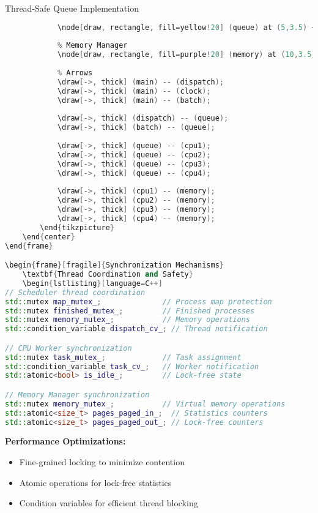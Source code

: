 \documentclass[10pt]{beamer}
\begin{document}
\begin{frame}[fragile]{Thread-Safe Queue Implementation}
\begin{lstlisting}[language=C++]
            % Thread-Safe Queue
            \node[draw, rectangle, fill=yellow!20] (queue) at (5,3.5) {Ready Queue};
            
            % Memory Manager
            \node[draw, rectangle, fill=purple!20] (memory) at (10,3.5) {Memory Manager};
            
            % Arrows
            \draw[->, thick] (main) -- (dispatch);
            \draw[->, thick] (main) -- (clock);
            \draw[->, thick] (main) -- (batch);
            
            \draw[->, thick] (dispatch) -- (queue);
            \draw[->, thick] (batch) -- (queue);
            
            \draw[->, thick] (queue) -- (cpu1);
            \draw[->, thick] (queue) -- (cpu2);
            \draw[->, thick] (queue) -- (cpu3);
            \draw[->, thick] (queue) -- (cpu4);
            
            \draw[->, thick] (cpu1) -- (memory);
            \draw[->, thick] (cpu2) -- (memory);
            \draw[->, thick] (cpu3) -- (memory);
            \draw[->, thick] (cpu4) -- (memory);
        \end{tikzpicture}
    \end{center}
\end{frame}

\begin{frame}[fragile]{Synchronization Mechanisms}
    \textbf{Thread Coordination and Safety}
    \begin{lstlisting}[language=C++]
// Scheduler thread coordination
std::mutex map_mutex_;              // Process map protection
std::mutex finished_mutex_;         // Finished processes
std::mutex memory_mutex_;           // Memory operations
std::condition_variable dispatch_cv_; // Thread notification

// CPU Worker synchronization
std::mutex task_mutex_;             // Task assignment
std::condition_variable task_cv_;   // Worker notification
std::atomic<bool> is_idle_;         // Lock-free state

// Memory Manager synchronization
std::mutex memory_mutex_;           // Virtual memory operations
std::atomic<size_t> pages_paged_in_;  // Statistics counters
std::atomic<size_t> pages_paged_out_; // Lock-free counters
    \end{lstlisting}
    
    \vspace{0.3cm}
    \textbf{Performance Optimizations:}
    \begin{itemize}
        \item Fine-grained locking to minimize contention
        \item Atomic operations for lock-free statistics
        \item Condition variables for efficient thread blocking
    \end{itemize}
\end{frame}
\end{document}
